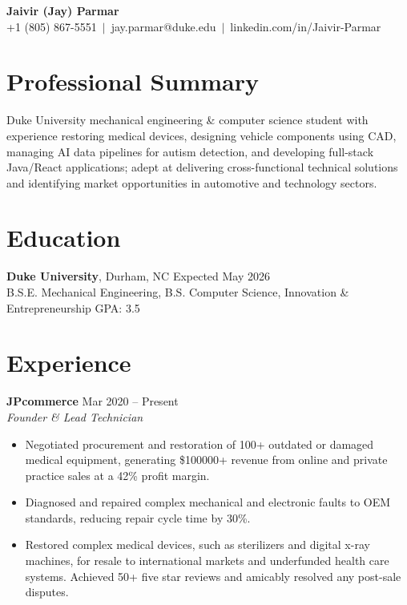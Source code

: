 \documentclass[11pt]{article}
\begin{document}
\begin{center}
    {\LARGE \textbf{Jaivir (Jay) Parmar}}\\[0.2cm]
    +1 (805) 867-5551 \,$\vert$\, jay.parmar@duke.edu \,$\vert$\, linkedin.com/in/Jaivir-Parmar
\end{center}

\section*{Professional Summary}
Duke University mechanical engineering \& computer science student with experience restoring medical devices,  designing vehicle components using CAD, managing AI data pipelines for autism detection, and developing full-stack Java/React applications; adept at delivering cross-functional technical solutions and identifying market opportunities in automotive and technology sectors.

\section*{Education}
\textbf{Duke University}, Durham, NC \hfill Expected May 2026\\
B.S.E. Mechanical Engineering, B.S. Computer Science, Innovation \& Entrepreneurship \hfill GPA: 3.5

\section*{Experience}

\textbf{JPcommerce} \hfill Mar 2020 -- Present\\
\textit{Founder \& Lead Technician}
\begin{itemize}
    \item Negotiated procurement and restoration of 100+ outdated or damaged medical equipment, generating \$100000+ revenue from online and private practice sales at a 42\% profit margin.
    \item Diagnosed and repaired complex mechanical and electronic faults to OEM standards, reducing repair cycle time by 30\%.
    \item Restored complex medical devices, such as sterilizers and digital x-ray machines, for resale to international markets and underfunded health care systems. Achieved 50+ five star reviews and amicably resolved any post-sale disputes.
\end{itemize}
\end{document}
